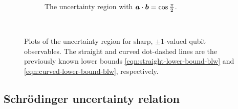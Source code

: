\begin{figure}[ht]
\begin{subfigure}[b]{0.4\textwidth}
    \caption{The uncertainty region with $\bm{a}\cdot\bm{b} = \cos\frac{\pi}{2}$.}
    \label{fig:err-region-pi-by-2}
  \end{subfigure}\\
  \caption[Plots of the uncertainty region for sharp, $\pm1$-valued qubit observables.]{Plots of the uncertainty region for sharp, $\pm1$-valued qubit observables. The straight and curved dot-dashed lines are the previously known lower bounds \eqref{eqn:straight-lower-bound-blw} and \eqref{eqn:curved-lower-bound-blw}, respectively.}
  \label{fig:top-level-err-region}
\end{figure}


\subsection{Schr\"odinger uncertainty relation}\label{sec:sch-uncertainty-relation}


